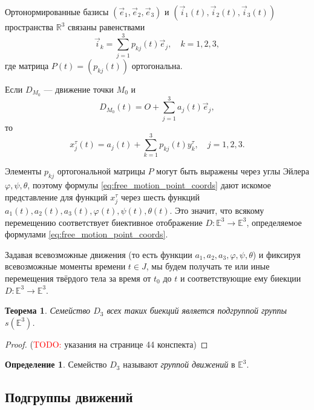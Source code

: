 \documentclass{article}
\theoremstyle{definition}
\newtheorem{definition}{Определение}[section]
\theoremstyle{plain}
\newtheorem{theorem}{Теорема}[section]
\theoremstyle{remark}
\numberwithin{equation}{section}
\begin{document}
Ортонормированные базисы $(\vec{e}_1, \vec{e}_2, \vec{e}_3)$ и $(\vec{i}_1(t),
\vec{i}_2(t), \vec{i}_3(t))$ пространства $\mathbb{R}^3$ связаны равенствами
\begin{equation}
  \vec{i}_k = \sum_{j=1}^{3} p_{kj}(t) \vec{e}_j, \quad k = 1,2,3,
\end{equation}
где матрица $P(t) = (p_{kj}(t))$ ортогональна.

Если $D_{M_0}$ --- движение точки $M_0$ и
\begin{equation*}
  D_{M_0}(t) = O + \sum_{j=1}^{3} a_j(t) \vec{e}_j,
\end{equation*}
то
\begin{equation}
  \label{eq:free_motion_point_coords}
  x_j^\tau(t) = a_j(t) + \sum_{k=1}^{3} p_{kj}(t) y_k^\tau, \quad j = 1,2,3.
\end{equation}

Элементы $p_{kj}$ ортогональной матрицы $P$ могут быть выражены через углы
Эйлера $\varphi, \psi, \theta$, поэтому формулы
\ref{eq:free_motion_point_coords} дают искомое представление для функций
$x_j^\tau$ через шесть функций $a_1(t), a_2(t), a_3(t), \varphi(t), \psi(t),
\theta(t)$. Это значит, что всякому перемещению соответствует биективное
отображение $D : \mathbb{E}^3 \to \mathbb{E}^3$, определяемое формулами
\ref{eq:free_motion_point_coords}.

Задавая всевозможные движения (то есть функции $a_1, a_2, a_3, \varphi, \psi,
\theta$) и фиксируя всевозможные моменты времени $t \in J$, мы будем получать те
или иные перемещения твёрдого тела за время от $t_0$ до $t$ и соответствующие
ему биекции $D : \mathbb{E}^3 \to \mathbb{E}^3$.

\begin{theorem}
  Семейство $D_3$ всех таких биекций является подгруппой группы
  $s(\mathbb{E}^3)$.
\end{theorem}

\begin{proof}
  (\textcolor{red}{TODO:} указания на странице 44 конспекта)
\end{proof}

\begin{definition}
  Семейство $D_3$ называют \textit{группой движений} в $\mathbb{E}^3$.
\end{definition}

\subsection{Подгруппы движений}
\end{document}
